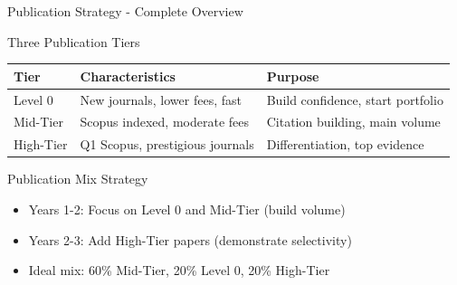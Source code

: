 \documentclass[11pt]{beamer}
\begin{document}
	\begin{frame}{Publication Strategy - Complete Overview}
		\scriptsize
		\begin{block}{Three Publication Tiers}
			\centering
			\begin{tabular}{|p{3cm}|p{4cm}|p{3cm}|}
				\hline
				\textbf{Tier} & \textbf{Characteristics} & \textbf{Purpose} \\
				\hline
				Level 0 & New journals, lower fees, fast & Build confidence, start portfolio \\
				\hline
				Mid-Tier & Scopus indexed, moderate fees & Citation building, main volume \\
				\hline
				High-Tier & Q1 Scopus, prestigious journals & Differentiation, top evidence \\
				\hline
			\end{tabular}
		\end{block}
		\begin{block}{Publication Mix Strategy}
			\begin{itemize}
				\item Years 1-2: Focus on Level 0 and Mid-Tier (build volume)
				\item Years 2-3: Add High-Tier papers (demonstrate selectivity)
				\item Ideal mix: 60\% Mid-Tier, 20\% Level 0, 20\% High-Tier
			\end{itemize}
		\end{block}
	\end{frame}
	
\end{document}
